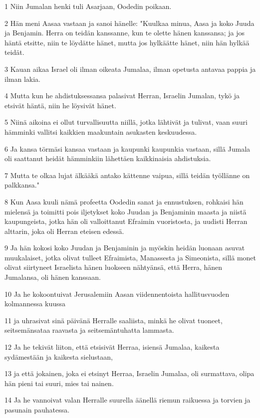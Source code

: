 \par 1 Niin Jumalan henki tuli Asarjaan, Oodedin poikaan.
\par 2 Hän meni Aasaa vastaan ja sanoi hänelle: "Kuulkaa minua, Aasa ja koko Juuda ja Benjamin. Herra on teidän kanssanne, kun te olette hänen kanssansa; ja jos häntä etsitte, niin te löydätte hänet, mutta jos hylkäätte hänet, niin hän hylkää teidät.
\par 3 Kauan aikaa Israel oli ilman oikeata Jumalaa, ilman opetusta antavaa pappia ja ilman lakia.
\par 4 Mutta kun he ahdistuksessansa palasivat Herran, Israelin Jumalan, tykö ja etsivät häntä, niin he löysivät hänet.
\par 5 Niinä aikoina ei ollut turvallisuutta niillä, jotka lähtivät ja tulivat, vaan suuri hämminki vallitsi kaikkien maakuntain asukasten keskuudessa.
\par 6 Ja kansa törmäsi kansaa vastaan ja kaupunki kaupunkia vastaan, sillä Jumala oli saattanut heidät hämminkiin lähettäen kaikkinaisia ahdistuksia.
\par 7 Mutta te olkaa lujat älkääkä antako kättenne vaipua, sillä teidän työllänne on palkkansa."
\par 8 Kun Aasa kuuli nämä profeetta Oodedin sanat ja ennustuksen, rohkaisi hän mielensä ja toimitti pois iljetykset koko Juudan ja Benjaminin maasta ja niistä kaupungeista, jotka hän oli valloittanut Efraimin vuoristosta, ja uudisti Herran alttarin, joka oli Herran eteisen edessä.
\par 9 Ja hän kokosi koko Juudan ja Benjaminin ja myöskin heidän luonaan asuvat muukalaiset, jotka olivat tulleet Efraimista, Manassesta ja Simeonista, sillä monet olivat siirtyneet Israelista hänen luokseen nähtyänsä, että Herra, hänen Jumalansa, oli hänen kanssaan.
\par 10 Ja he kokoontuivat Jerusalemiin Aasan viidennentoista hallitusvuoden kolmannessa kuussa
\par 11 ja uhrasivat sinä päivänä Herralle saaliista, minkä he olivat tuoneet, seitsemänsataa raavasta ja seitsemäntuhatta lammasta.
\par 12 Ja he tekivät liiton, että etsisivät Herraa, isiensä Jumalaa, kaikesta sydämestään ja kaikesta sielustaan,
\par 13 ja että jokainen, joka ei etsinyt Herraa, Israelin Jumalaa, oli surmattava, olipa hän pieni tai suuri, mies tai nainen.
\par 14 Ja he vannoivat valan Herralle suurella äänellä riemun raikuessa ja torvien ja pasunain pauhatessa.
